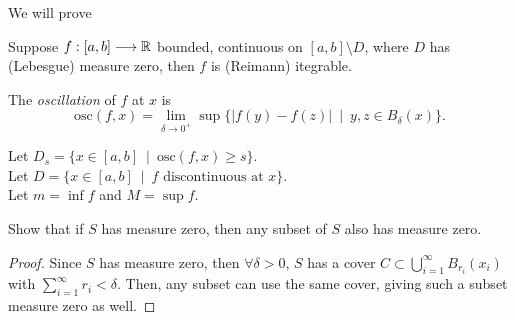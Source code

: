 \documentclass[../hw6]{subfiles}
\begin{document}
We will prove
\begin{theorem}
	Suppose $f:[a,b]\longrightarrow\mathbb{R}$ bounded, continuous on $[a,b]\setminus D$, where $D$ has (Lebesgue) measure zero, then $f$ is (Reimann) itegrable.
\end{theorem}
\begin{definition}
	The \textit{oscillation} of $f$ at $x$ is  \[
		\text{osc}(f,x)=\lim_{\delta \to 0^+} \sup \{|f(y)-f(z)|\ \mid\ y,z\in B_{\delta}(x)\}
		.\]
\end{definition}
Let $D_s = \{x \in [a,b] \ \mid\ \text{osc}(f,x)\ge s\} $.\\
Let $D = \{x \in [a,b]\ \mid\ f \text{ discontinuous at } x \} $.\\
Let $m=\inf f$ and  $M = \sup f$.

\begin{problem}[1]
Show that if $S$ has measure zero, then any subset of $S$ also has measure zero.
\end{problem}
\begin{proof}
	Since $S$ has measure zero, then  $\forall \delta>0$, $S$ has a cover $C\subset \bigcup\limits_{i=1}^{\infty} B_{r_i}(x_i)$ with $\sum\limits_{i=1}^{\infty} r_i < \delta$.
	Then, any subset can use the same cover, giving such a subset measure zero as well.
\end{proof}
\end{document}
